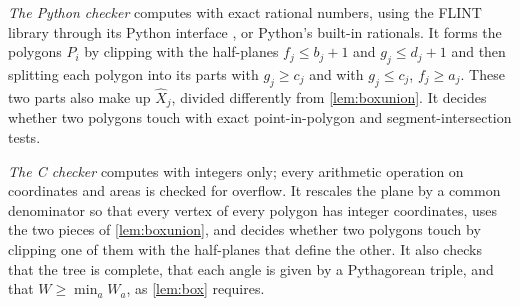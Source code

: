 \emph{The Python checker} computes with exact rational numbers, using the FLINT library \cite{flint} through its Python interface \cite{pythonflint}, or Python's built-in rationals. It forms the polygons $P_i$ by clipping with the half-planes $f_j\le b_j+1$ and $g_j\le d_j+1$ and then splitting each polygon into its parts with $g_j\ge c_j$ and with $g_j\le c_j$, $f_j\ge a_j$. These two parts also make up $\widehat{X}_j$, divided differently from \cref{lem:boxunion}. It decides whether two polygons touch with exact point-in-polygon and segment-intersection tests.

\emph{The C checker} computes with integers only; every arithmetic operation on coordinates and areas is checked for overflow. It rescales the plane by a common denominator so that every vertex of every polygon has integer coordinates, uses the two pieces of \cref{lem:boxunion}, and decides whether two polygons touch by clipping one of them with the half-planes that define the other. It also checks that the tree is complete, that each angle is given by a Pythagorean triple, and that $W\ge\min_aW_a$, as \cref{lem:box} requires.


